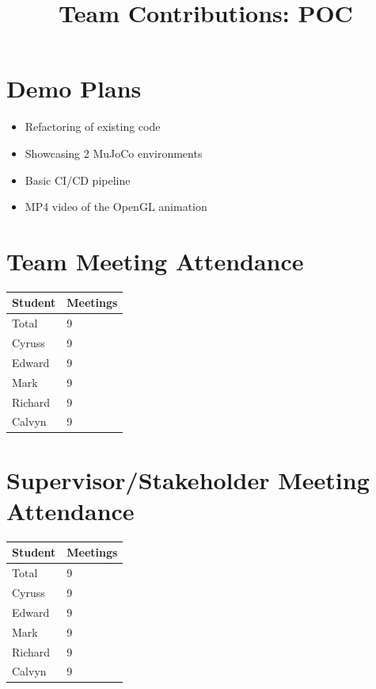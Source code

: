 \documentclass{article}
\title{Team Contributions: POC\\\progname}
\author{\authname}
\date{}
\begin{document}
\maketitle

\section{Demo Plans}

\begin{itemize}
    \item Refactoring of existing code 
    \item Showcasing 2 MuJoCo environments
    \item Basic CI/CD pipeline
    \item MP4 video of the OpenGL animation
\end{itemize}

\section{Team Meeting Attendance}

\begin{table}[H]
\centering
\begin{tabular}{ll}
\toprule
\textbf{Student} & \textbf{Meetings}\\
\midrule
Total & 9\\
Cyruss & 9\\
Edward & 9\\
Mark & 9\\
Richard & 9\\
Calvyn & 9\\
\bottomrule
\end{tabular}
\end{table}

\section{Supervisor/Stakeholder Meeting Attendance}

\begin{table}[H]
    \centering
    \begin{tabular}{ll}
    \toprule
    \textbf{Student} & \textbf{Meetings}\\
    \midrule
    Total & 9\\
    Cyruss & 9\\
    Edward & 9\\
    Mark & 9\\
    Richard & 9\\
    Calvyn & 9\\
    \bottomrule
    \end{tabular}
    \end{table}
\end{document}
